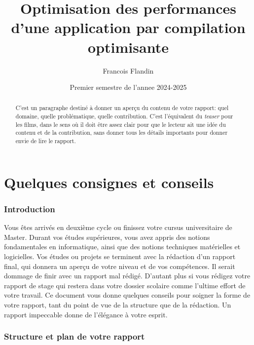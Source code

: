 \documentclass{rapport}
\title{Optimisation des performances d'une application par compilation optimisante}
\author{Francois Flandin}
\date{Premier semestre de l'annee 2024-2025}
\begin{document}
  \maketitle

  \begin{abstract}
    C'est un paragraphe destiné à donner un aperçu du contenu de votre rapport: quel domaine, quelle problématique, quelle contribution. C'est l'équivalent du {\it teaser} pour les films, dans le sens où il doit être assez clair pour que le lecteur ait une idée du contenu et de la contribution, sans donner tous les détails importants pour  donner envie de lire le rapport.
  \end{abstract}

  \clearpage
  \tableofcontents

  \clearpage

  \part{Quelques consignes et conseils}

    \section{Introduction}
    
      Vous êtes arrivés en deuxième cycle ou finissez votre cursus universitaire de Master. Durant vos études supérieures, vous avez appris des notions fondamentales en informatique, ainsi que des notions techniques matérielles et logicielles. Vos études ou projets se terminent avec la rédaction d'un rapport final, qui donnera un aperçu de votre niveau et de vos compétences. Il serait dommage de finir avec un rapport mal rédigé. D'autant plus si vous rédigez votre rapport de stage qui restera dans votre dossier scolaire comme l'ultime effort de votre travail. Ce document vous donne quelques conseils pour soigner la forme de votre rapport, tant du point de vue de la structure que de la rédaction. Un rapport impeccable donne de l'élégance à votre esprit.
    
    \section{Structure et plan de votre rapport} 
    
\end{document}
